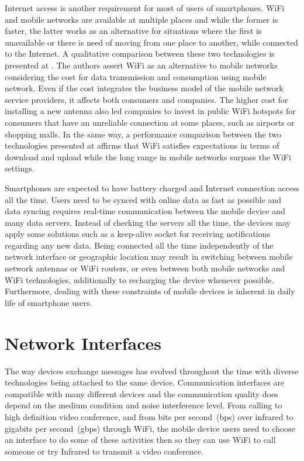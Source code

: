 Internet access is another requirement for most of users of smartphones.
WiFi and mobile networks are available at multiple places and while the former is faster, the latter works as an alternative for situations where the first is unavailable or there is need of moving from one place to another, while connected to the Internet.
A qualitative comparison between these two technologies is presented at \cite{Lehr2003wireless}.
The authors assert WiFi as an alternative to mobile networks considering the cost for data transmission and consumption using mobile network.
Even if the cost integrates the business model of the mobile network service providers, it affects both consumers and companies.
The higher cost for installing a new antenna also led companies to invest in public WiFi hotspots for consumers that have an unreliable connection at some places, such as airports or shopping malls.
In the same way, a performance comparison between the two technologies presented at \cite{Gass20103gwificomparison} affirms that WiFi satisfies expectations in terms of download and upload while the long range in mobile networks surpass the WiFi settings.

Smartphones are expected to have battery charged and Internet connection access all the time.
Users need to be synced with online data as fast as possible and data syncing requires real-time communication between the mobile device and many data servers.
Instead of checking the servers all the time, the devices may apply some solutions such as a keep-alive socket for receiving notifications regarding any new data.
Being connected all the time independently of the network interface or geographic location may result in switching between mobile network antennas or WiFi routers, or even between both mobile networks and WiFi technologies, additionally to recharging the device whenever possible.
Furthermore, dealing with these constraints of mobile devices is inherent in daily life of smartphone users.

\section{Network Interfaces}
\label{sec:networkinterfaces}

The way devices exchange messages has evolved throughout the time with diverse technologies being attached to the same device.
Communication interfaces are compatible with many different devices and the communication quality does depend on the medium condition and noise interference level.
From calling to high definition video conference, and from bits per second~(bps) over infrared to gigabits per second~(gbps) through WiFi, the mobile device users need to choose an interface to do some of these activities then so they can use WiFi to call someone or try Infrared to transmit a video conference.


